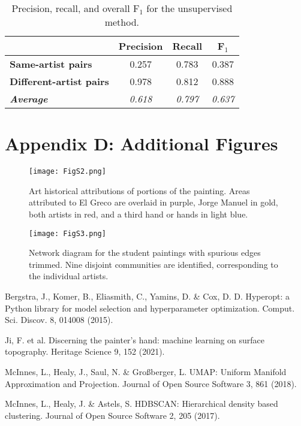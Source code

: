 \documentclass[11pt]{article}
\begin{document}
\begin{table}[htb]
\centering
\renewcommand{\arraystretch}{1.05}
\selectfont
\begin{tabular}{|l|c|c|c|} 
\hline
 &\textbf{Precision}&\textbf{Recall} & \textbf{F$_1$}\\
\hline
\textbf{Same-artist pairs}&0.257&0.783&0.387\\
\textbf{Different-artist pairs}&0.978&0.812&0.888\\
\textbf{\em Average}&\textit{0.618}&\textit{0.797}&\textit{0.637}\\ 
\hline
\end{tabular}
\caption{Precision, recall, and overall F$_1$ for the unsupervised method.}
\label{table:S32}
\end{table}





\newpage
\section*{\selectfont Appendix D: Additional Figures}

\begin{figure}[htb] \centering \texttt{[image: FigS2.png]}
\caption{Art historical attributions of portions of the painting. Areas attributed to El Greco are overlaid in purple, Jorge Manuel in gold, both artists in red, and a third hand or hands in light blue. }
\end{figure}
\clearpage
\makeatletter
\setlength{\@fptop}{0pt}
\makeatother
\begin{figure}[] \centering \texttt{[image: FigS3.png]}
\caption{Network diagram for the student paintings with spurious edges trimmed. Nine disjoint communities are identified, corresponding to the individual artists.}
\end{figure}

\renewcommand{\refname}{Supplementary References}

\begin{thebibliography}{4}

Bergstra, J., Komer, B., Eliasmith, C., Yamins, D. \& Cox, D. D. Hyperopt: a Python library for model selection and hyperparameter optimization. Comput. Sci. Discov. 8, 014008 (2015).

Ji, F. et al. Discerning the painter’s hand: machine learning on surface topography. Heritage Science 9, 152 (2021).

McInnes, L., Healy, J., Saul, N. \& Großberger, L. UMAP: Uniform Manifold Approximation and Projection. Journal of Open Source Software 3, 861 (2018).

McInnes, L., Healy, J. \& Astels, S. HDBSCAN: Hierarchical density based clustering. Journal of Open Source Software 2, 205 (2017).

\end{thebibliography}
\end{document}
